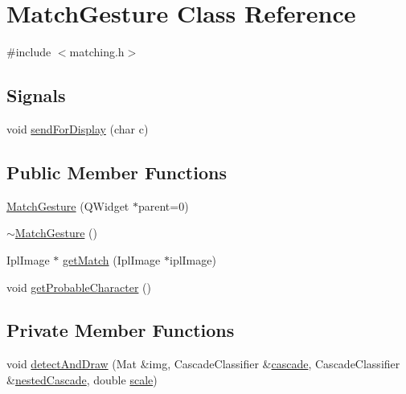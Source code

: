 \hypertarget{classMatchGesture}{
\section{MatchGesture Class Reference}
\label{classMatchGesture}
}


{\ttfamily \#include $<$matching.h$>$}

\subsection*{Signals}
\begin{DoxyCompactItemize}
\item 
void \hyperlink{classMatchGesture_acfe500262c9eeb39a197a1794c43bf03}{sendForDisplay} (char c)
\end{DoxyCompactItemize}
\subsection*{Public Member Functions}
\begin{DoxyCompactItemize}
\item 
\hyperlink{classMatchGesture_ab6f8541a52fdd6035e454eafe201412e}{MatchGesture} (QWidget $\ast$parent=0)
\item 
\hyperlink{classMatchGesture_a9285a6c18009ba55d57de792ab7db7bc}{$\sim$MatchGesture} ()
\item 
IplImage $\ast$ \hyperlink{classMatchGesture_a5a0a9cf82d44dfc2ed7281aa97901cfb}{getMatch} (IplImage $\ast$iplImage)
\item 
void \hyperlink{classMatchGesture_a4284d57d6fdb097ff0b45f49f1542fe6}{getProbableCharacter} ()
\end{DoxyCompactItemize}
\subsection*{Private Member Functions}
\begin{DoxyCompactItemize}
\item 
void \hyperlink{classMatchGesture_a9ee3f2771495fb72f7d558c27fe45423}{detectAndDraw} (Mat \&img, CascadeClassifier \&\hyperlink{classMatchGesture_a5f32a9342107ec1144c73c617c4d8e34}{cascade}, CascadeClassifier \&\hyperlink{classMatchGesture_aa938a749d3ef32508803cfd4fbf30c0a}{nestedCascade}, double \hyperlink{classMatchGesture_af3bb3af0d54664793eeaa80cf6249750}{scale})
\end{DoxyCompactItemize}
